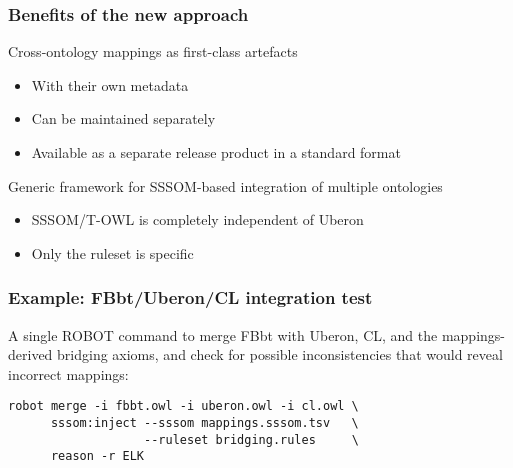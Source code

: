 \begin{frame}
  \frametitle{Benefits of the new approach}

  \begin{block}{Cross-ontology mappings as first-class artefacts}
    \begin{itemize}
      \item With their own metadata
      \item Can be maintained separately
      \item Available as a separate release product in a standard format
    \end{itemize}
  \end{block}

  \begin{block}{Generic framework for SSSOM-based integration of multiple ontologies}
    \begin{itemize}
      \item SSSOM/T-OWL is completely independent of Uberon
      \item Only the ruleset is specific
    \end{itemize}
  \end{block}
\end{frame}

\begin{frame}[fragile]
  \frametitle{Example: FBbt/Uberon/CL integration test}

  A single ROBOT command to merge FBbt with Uberon, CL, and the mappings-derived
  bridging axioms, and check for possible inconsistencies that would reveal
  incorrect mappings:

  \begin{block}{}
\begin{verbatim}
robot merge -i fbbt.owl -i uberon.owl -i cl.owl \
      sssom:inject --sssom mappings.sssom.tsv   \
                   --ruleset bridging.rules     \
      reason -r ELK
\end{verbatim}
  \end{block}
\end{frame}



